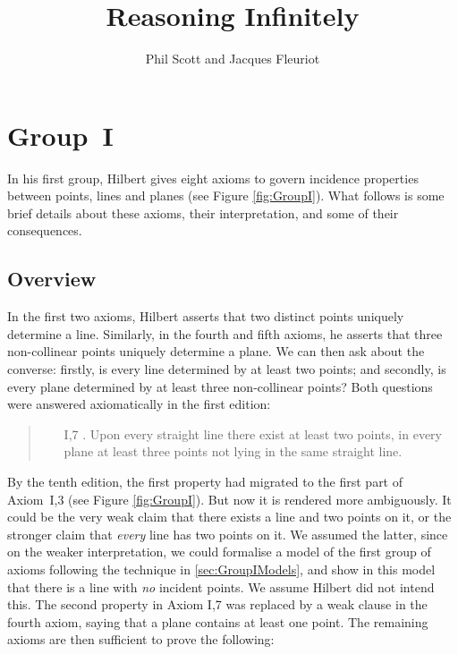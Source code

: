 \documentclass{article}
\author{Phil Scott and Jacques Fleuriot}
\title{Reasoning Infinitely}
\begin{document}
\maketitle

\section{Group~I}\label{sec:GroupI}
In his first group, Hilbert gives eight axioms to govern incidence properties between points, lines and planes (see Figure \ref{fig:GroupI}). What follows is some brief details about these axioms, their interpretation, and some of their consequences.

\subsection{Overview}
In the first two axioms, Hilbert asserts that two distinct points uniquely determine a line. Similarly, in the fourth and fifth axioms, he asserts that three non-collinear points uniquely determine a plane. We can then ask about the converse: firstly, is every line determined by at least two points; and secondly, is every plane determined by at least three non-collinear points? Both questions were answered axiomatically in the first edition:

\begin{quote}
  \begin{enumerate}
  \item[I,7]. Upon every straight line there exist at least two points, in every plane at least three points not lying in the same straight line.
  \end{enumerate}
\end{quote}

By the tenth edition, the first property had migrated to the first part of Axiom~I,3 (see Figure \ref{fig:GroupI}). But now it is rendered more ambiguously. It could be the very weak claim that there exists a line and two points on it, or the stronger claim that \emph{every} line has two points on it. We assumed the latter, since on the weaker interpretation, we could formalise a model of the first group of axioms following the technique in \ref{sec:GroupIModels}, and show in this model that there is a line with \emph{no} incident points. We assume Hilbert did not intend this. 
The second property in Axiom I,7 was replaced by a weak clause in the fourth axiom, saying that a plane contains at least one point. The remaining axioms are then sufficient to prove the following:
\end{document}
